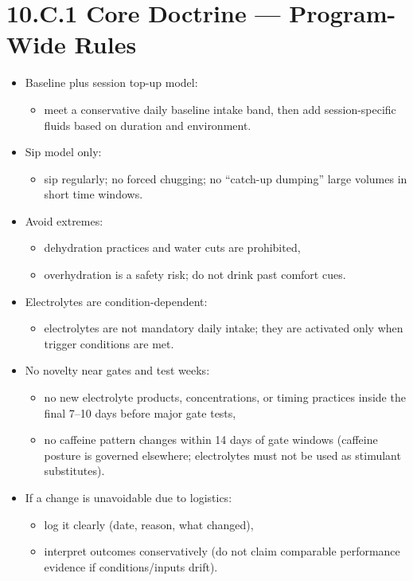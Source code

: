 \documentclass[10pt]{article}
\begin{document}
\section*{10.C.1 Core Doctrine — Program-Wide Rules}
{}

\begin{itemize}
\item Baseline plus session top-up model:
  \begin{itemize}
  \item meet a conservative daily baseline intake band, then add session-specific fluids based on duration and environment.
  \end{itemize}
\item Sip model only:
  \begin{itemize}
  \item sip regularly; no forced chugging; no “catch-up dumping” large volumes in short time windows.
  \end{itemize}
\item Avoid extremes:
  \begin{itemize}
  \item dehydration practices and water cuts are prohibited,
  \item overhydration is a safety risk; do not drink past comfort cues.
  \end{itemize}
\item Electrolytes are condition-dependent:
  \begin{itemize}
  \item electrolytes are not mandatory daily intake; they are activated only when trigger conditions are met.
  \end{itemize}
\item No novelty near gates and test weeks:
  \begin{itemize}
  \item no new electrolyte products, concentrations, or timing practices inside the final 7–10 days before major gate tests,
  \item no caffeine pattern changes within 14 days of gate windows (caffeine posture is governed elsewhere; electrolytes must not be used as stimulant substitutes).
  \end{itemize}
\item If a change is unavoidable due to logistics:
  \begin{itemize}
  \item log it clearly (date, reason, what changed),
  \item interpret outcomes conservatively (do not claim comparable performance evidence if conditions/inputs drift).
  \end{itemize}
\end{itemize}
\end{document}
